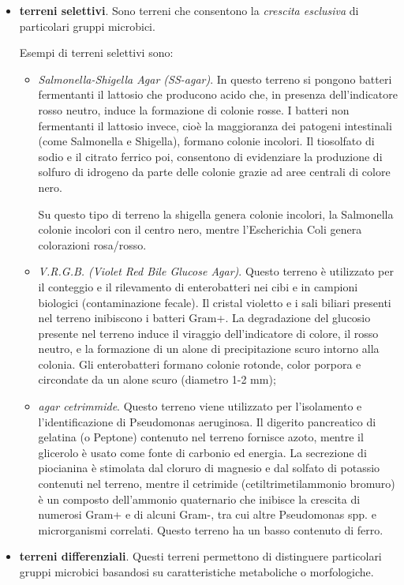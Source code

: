 \documentclass[11pt]{book}
\begin{document}
\begin{itemize}
\item \textbf{terreni selettivi}. Sono terreni che consentono la \emph{crescita esclusiva} di particolari gruppi microbici.

Esempi di terreni selettivi sono:
\begin{itemize}
\item \emph{Salmonella-Shigella Agar (SS-agar)}. In questo terreno si pongono batteri fermentanti il lattosio che producono acido che, in presenza dell'indicatore rosso neutro, induce la formazione di colonie rosse. I batteri non fermentanti il lattosio invece, cioè la maggioranza dei patogeni intestinali (come Salmonella e Shigella), formano colonie incolori. Il tiosolfato di sodio e il citrato ferrico poi, consentono di evidenziare la produzione di solfuro di idrogeno da parte delle colonie grazie ad aree centrali di colore nero.

Su questo tipo di terreno la shigella genera colonie incolori, la Salmonella colonie incolori con il centro nero, mentre l'Escherichia Coli genera colorazioni rosa/rosso.
\item \emph{V.R.G.B. (Violet Red Bile Glucose Agar)}. Questo terreno è utilizzato per il conteggio e il rilevamento di enterobatteri nei cibi e in campioni biologici (contaminazione fecale). Il cristal violetto e i sali biliari presenti nel terreno inibiscono i batteri Gram+. La degradazione del glucosio presente nel terreno induce il viraggio dell’indicatore di colore, il rosso neutro, e la formazione di un alone di precipitazione scuro intorno alla colonia. Gli enterobatteri formano colonie rotonde, color porpora e circondate da un alone scuro (diametro 1-2 mm);
\item \emph{agar cetrimmide}. Questo terreno viene utilizzato per l’isolamento e l’identificazione di Pseudomonas aeruginosa. Il digerito pancreatico di gelatina (o Peptone) contenuto nel terreno fornisce azoto, mentre il glicerolo è usato come fonte di carbonio ed energia.
La secrezione di piocianina è stimolata dal cloruro di magnesio e dal solfato di potassio contenuti nel terreno, mentre il cetrimide (cetiltrimetilammonio bromuro) è un composto dell'ammonio quaternario che inibisce la crescita di numerosi Gram+ e di alcuni Gram-, tra cui altre Pseudomonas spp. e microrganismi correlati. Questo terreno ha un basso contenuto di ferro.
\end{itemize} 


\item \textbf{terreni differenziali}. Questi terreni permettono di distinguere particolari gruppi microbici basandosi su caratteristiche metaboliche o morfologiche.


\end{itemize}
\end{document}
